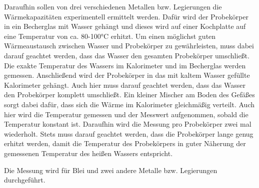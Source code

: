 Daraufhin sollen von drei verschiedenen Metallen bzw. Legierungen die Wärmekapazitäten
experimentell ermittelt werden. Dafür wird der Probekörper in ein Becherglas mit
Wasser gehängt und dieses wird auf einer Kochplatte auf eine Temperatur von ca. 80-100°C erhitzt.
Um einen möglichst guten Wärmeaustausch zwischen Wasser und Probekörper zu gewährleisten, muss dabei
darauf geachtet werden, dass das Wasser den gesamten Probekörper umschließt. Die
exakte Temperatur des Wassers im Kalorimeter und im Becherglas werden gemessen.
Anschließend wird der Probekörper in das mit kaltem Wasser gefüllte Kalorimeter gehängt. Auch
hier muss darauf geachtet werden, dass das Wasser den Probekörper komplett umschließt. Ein
kleiner Mischer am Boden des Gefäßes sorgt dabei dafür, dass sich die Wärme im Kalorimeter
gleichmäßig verteilt. Auch hier wird die Temperatur gemessen und der Messwert aufgenommen,
sobald die Temperatur konstant ist. Daraufhin wird die Messung pro Probekörper zwei mal
wiederholt. Stets muss darauf geachtet werden, dass die Probekörper lange genug erhitzt
werden, damit die Temperatur des Probekörpers in guter Näherung der gemessenen Temperatur
des heißen Wassers entspricht.

Die Messung wird für Blei und zwei andere Metalle bzw. Legierungen durchgeführt.
